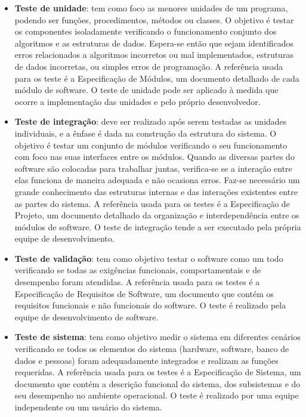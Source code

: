 \begin{itemize}

\item {\textbf{Teste de unidade}}: tem como foco as menores unidades de um programa, podendo ser funções, procedimentos, métodos ou classes. O objetivo é testar os componentes isoladamente verificando o funcionamento conjunto dos algoritmos e as estruturas de dados. Espera-se então que sejam identificados erros relacionados a algoritmos incorretos ou mal implementados, estruturas de dados incorretas, ou simples erros de programação.  A referência usada para os teste é a Especificação de Módulos, um documento detalhado de cada módulo de software. O teste de unidade pode ser aplicado à medida que ocorre a implementação das unidades e pelo próprio desenvolvedor. 

\item {\textbf{Teste de integração}}: deve ser realizado após serem testadas as unidades individuais, e a ênfase é dada na construção da estrutura do sistema. O objetivo é testar um conjunto de módulos verificando o seu funcionamento com foco nas suas interfaces entre os módulos. Quando as diversas partes do software são colocadas para trabalhar juntas, verifica-se se a interação entre elas funciona de maneira adequada e não ocasiona erros. Faz-se necessário um grande conhecimento das estruturas internas e das interações existentes entre as partes do sistema. A referência usada para os testes é a Especificação de Projeto, um documento detalhado da organização e interdependência entre os módulos de software. O teste de integração tende a ser executado pela própria equipe de desenvolvimento. 

\item {\textbf{Teste de validação}}: tem como objetivo testar o software como um todo verificando se todas as exigências funcionais, comportamentais e de desempenho foram atendidas. A referência usada para os testes é a Especificação de Requisitos de Software, um documento que contém os requisitos funcionais e não funcionais do software. O teste é realizado pela equipe de desenvolvimento de software.

\item {\textbf{Teste de sistema}}: tem como objetivo medir o sistema em diferentes cenários verificando se todos os elementos do sistema (hardware, software, banco de dados e pessoas) foram adequadamente integrados e realizam as funções requeridas. A referência usada para os testes é a Especificação de Sistema, um documento que contém a descrição funcional do sistema, dos subsistemas e do seu desempenho no ambiente operacional. O teste é realizado por uma equipe independente ou um usuário do sistema.

\end{itemize}

